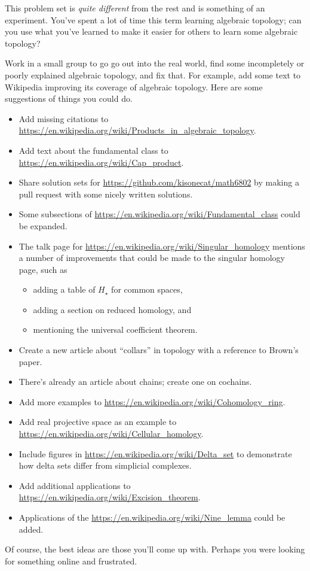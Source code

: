 \documentclass{homework}
\author{Jim Fowler}
\begin{document}
This problem set is \textit{quite different} from the rest and is
something of an experiment.  You've spent a lot of time this term
learning algebraic topology; can you use what you've learned to make
it easier for others to learn some algebraic topology?

Work in a small group to go go out into the real world, find some
incompletely or poorly explained algebraic topology, and fix that.
For example, add some text to Wikipedia improving its coverage of
algebraic topology.  Here are some suggestions of things you could do.
\begin{itemize}
\item Add missing citations to \url{https://en.wikipedia.org/wiki/Products_in_algebraic_topology}.
\item Add text about the fundamental class to \url{https://en.wikipedia.org/wiki/Cap_product}.
  \item Share solution sets for \url{https://github.com/kisonecat/math6802} by making a pull request with some nicely written solutions.
   \item Some subsections of \url{https://en.wikipedia.org/wiki/Fundamental_class} could be expanded.
\item The talk page for \url{https://en.wikipedia.org/wiki/Singular_homology} mentions a number of improvements that could be made to the singular homology page, such as
  \begin{itemize}
  \item adding a table of $H_\star$ for common spaces,
  \item adding a section on reduced homology, and
    \item mentioning the universal coefficient theorem.
    \end{itemize}
  \item Create a new article about ``collars'' in topology with a reference to Brown's paper.
  \item There's already an article about chains; create one on cochains.
  \item Add more examples to \url{https://en.wikipedia.org/wiki/Cohomology_ring}.
  \item Add real projective space as an example to \url{https://en.wikipedia.org/wiki/Cellular_homology}.
   \item Include figures in \url{https://en.wikipedia.org/wiki/Delta_set} to demonstrate how delta sets differ from simplicial complexes.
   \item Add additional applications to \url{https://en.wikipedia.org/wiki/Excision_theorem}.
     \item Applications of the \url{https://en.wikipedia.org/wiki/Nine_lemma} could be added.
\end{itemize}       
Of course, the best ideas are those you'll come up with.  Perhaps you were looking for something online and frustrated.
\end{document}
